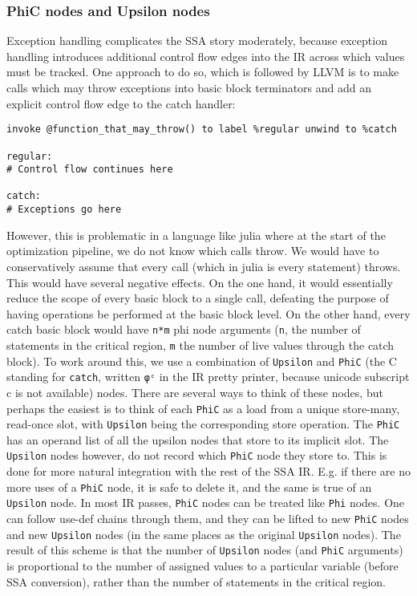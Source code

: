 \hypertarget{1498305755051877944}{}


\subsubsection{PhiC nodes and Upsilon nodes}



Exception handling complicates the SSA story moderately, because exception handling introduces additional control flow edges into the IR across which values must be tracked. One approach to do so, which is followed by LLVM is to make calls which may throw exceptions into basic block terminators and add an explicit control flow edge to the catch handler:




\begin{lstlisting}
invoke @function_that_may_throw() to label %regular unwind to %catch

regular:
# Control flow continues here

catch:
# Exceptions go here
\end{lstlisting}



However, this is problematic in a language like julia where at the start of the optimization pipeline, we do not know which calls throw. We would have to conservatively assume that every call (which in julia is every statement) throws. This would have several negative effects. On the one hand, it would essentially reduce the scope of every basic block to a single call, defeating the purpose of having operations be performed at the basic block level. On the other hand, every catch basic block would have \texttt{n*m} phi node arguments (\texttt{n}, the number of statements in the critical region, \texttt{m} the number of live values through the catch block). To work around this, we use a combination of \texttt{Upsilon} and \texttt{PhiC} (the C standing for \texttt{catch}, written \texttt{φᶜ} in the IR pretty printer, because unicode subscript c is not available) nodes. There are several ways to think of these nodes, but perhaps the easiest is to think of each \texttt{PhiC} as a load from a unique store-many, read-once slot, with \texttt{Upsilon} being the corresponding store operation. The \texttt{PhiC} has an operand list of all the upsilon nodes that store to its implicit slot. The \texttt{Upsilon} nodes however, do not record which \texttt{PhiC} node they store to. This is done for more natural integration with the rest of the SSA IR. E.g. if there are no more uses of a \texttt{PhiC} node, it is safe to delete it, and the same is true of an \texttt{Upsilon} node. In most IR passes, \texttt{PhiC} nodes can be treated like \texttt{Phi} nodes. One can follow use-def chains through them, and they can be lifted to new \texttt{PhiC} nodes and new \texttt{Upsilon} nodes (in the same places as the original \texttt{Upsilon} nodes). The result of this scheme is that the number of \texttt{Upsilon} nodes (and \texttt{PhiC} arguments) is proportional to the number of assigned values to a particular variable (before SSA conversion), rather than the number of statements in the critical region.



